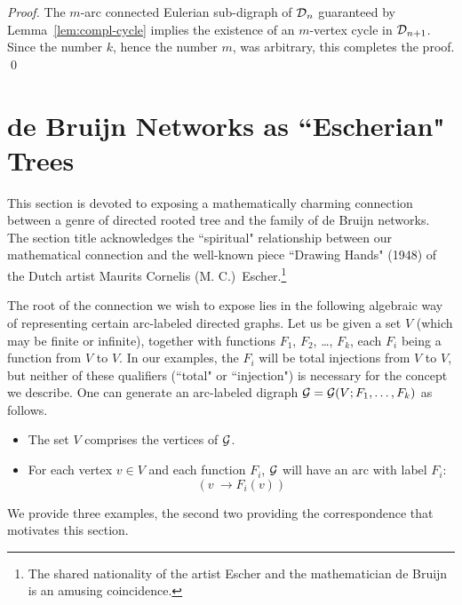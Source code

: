 \begin{proof}
\smallskip

The $m$-arc connected Eulerian sub-digraph of $\mbox{$\cal D$}_n$ guaranteed by
Lemma~\ref{lem:compl-cycle} implies the existence of an $m$-vertex cycle in $\mbox{$\cal D$}_{n+1}$.  Since
the number $k$, hence the number $m$, was arbitrary, this completes the proof.  \qed
\end{proof}


\section{de Bruijn Networks as ``Escherian" Trees} 
\label{Appendix:tree-DB}


This section is devoted to exposing a mathematically charming connection between a genre of
directed rooted tree and the family of de Bruijn networks.  The section title acknowledges the 
``spiritual" relationship between our mathematical connection and the well-known piece 
``Drawing Hands" (1948) of the Dutch artist Maurits Cornelis (M. C.)~Escher.\footnote{The shared nationality of the artist Escher and the mathematician de Bruijn is an amusing coincidence.}

\medskip


The root of the connection we wish to expose lies in the following algebraic way of representing certain arc-labeled directed graphs.  Let us be given a set $V$ (which may be finite or infinite),  
together with functions $F_1$,  $F_2$, \ldots, $F_k$, each $F_i$ being a function from $V$ to $V$.  In our examples, the $F_i$ will be total injections from $V$ to $V$, but neither of these qualifiers (``total" or ``injection") is necessary for the concept we describe.  One can generate an arc-labeled digraph $\mbox{$\cal G$} = \mbox{$\cal G$}(V; F_1, \ldots, F_k)$ as follows.
\begin{itemize}
\item
The set $V$ comprises the vertices of $\mbox{$\cal G$}$.
\item
For each vertex $v \in V$ and each function $F_i$, $\mbox{$\cal G$}$ will have an arc with label $F_i$:
\[ (v \ \rightarrow F_i(v)) \]
\end{itemize}
We provide three examples, the second two providing the correspondence that motivates this section.

\bigskip

